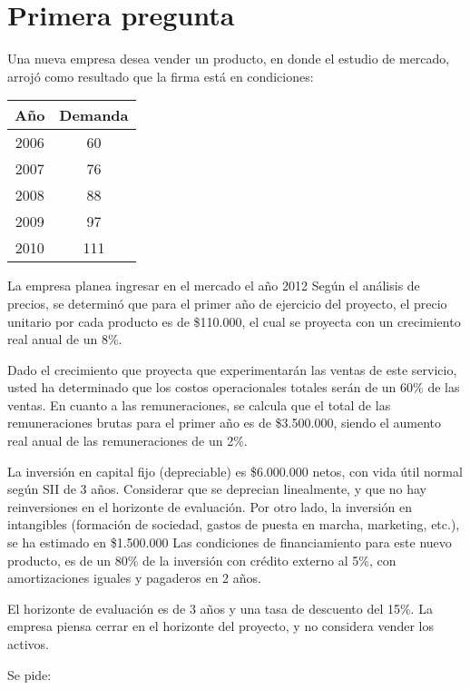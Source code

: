 \section{Primera pregunta}

Una nueva empresa desea vender un producto, en donde el estudio de mercado,
arrojó como resultado que la firma está en condiciones:

\begin{center}
    \begin{tabular}{|c|c|}
        \hline
        Año   &  Demanda\\\hline
        2006  &  60\\
        2007  &  76\\
        2008  &  88\\
        2009  &  97\\
        2010  &  111\\\hline
    \end{tabular}
\end{center}

La empresa planea ingresar en el mercado el año 2012 Según el análisis de precios,
se determinó que para el primer año de ejercicio del proyecto, el precio unitario
por cada producto es de \$110.000, el cual se proyecta con un crecimiento real anual de un 8\%.

Dado el crecimiento que proyecta que experimentarán las ventas de este servicio,
usted ha determinado que los costos operacionales totales serán de un 60\% de las ventas.
En cuanto a las remuneraciones, se calcula que el total de las remuneraciones brutas para
el primer año es de \$3.500.000, siendo el aumento real anual de las remuneraciones de un 2\%. 


La inversión en capital fijo (depreciable) es \$6.000.000 netos, con vida útil normal según SII de 3 años.
Considerar que se deprecian linealmente, y que no hay reinversiones en el horizonte de evaluación.
Por otro lado, la inversión en intangibles (formación de sociedad, gastos de puesta en marcha, marketing, etc.),
se ha estimado en \$1.500.000 
Las condiciones de financiamiento para este nuevo producto,
es de un 80\% de la inversión con crédito externo al 5\%, con amortizaciones iguales y pagaderos en 2 años. 

El horizonte de evaluación es de 3 años y una tasa de descuento del 15\%.
La empresa piensa cerrar en el horizonte del proyecto, y no considera vender los activos.

Se pide:


%
%

